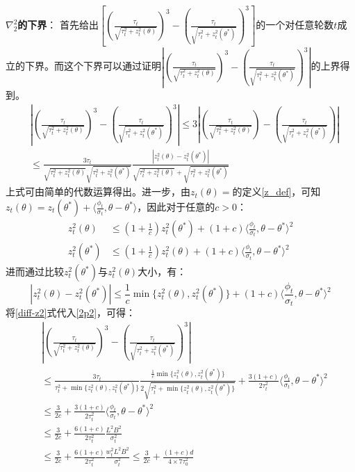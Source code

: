 \documentclass[UTF8,a4paper,10.5pt]{ctexart}
\begin{document}
\textbf{$\nabla^2_2$的下界}：
首先给出$\left[\left( \frac{\tau_t}{\sqrt{\tau_t^2 + z_t^2(\theta)}}\right)^3 - \left(\frac{\tau_t}{\sqrt{\tau_t^2 + z_t^2(\theta^*)}}\right)^3\right]$的一个对任意轮数$t$成立的下界。而这个下界可以通过证明$\left| \left( \frac{\tau_t}{\sqrt{\tau_t^2 + z_t^2(\theta)}}\right)^3 - \left(\frac{\tau_t}{\sqrt{\tau_t^2 + z_t^2(\theta^*)}}\right)^3 \right| 
$的上界得到。
\begin{align}
	&\left| \left( \frac{\tau_t}{\sqrt{\tau_t^2 + z_t^2(\theta)}}\right)^3 - \left(\frac{\tau_t}{\sqrt{\tau_t^2 + z_t^2(\theta^*)}}\right)^3 \right| 
	\leq 3\left| \left(\frac{\tau_t}{\sqrt{\tau_t^2 + z_t^2(\theta)}}\right) - \left(\frac{\tau_t}{\sqrt{\tau_t^2 + z_t^2(\theta^*)}}\right) \right|  \nonumber\\
	& \leq \frac{3\tau_t}{\sqrt{\tau_t^2 + z_t^2(\theta)}\sqrt{\tau_t^2 + z_t^2(\theta^*)}} \frac{|z_t^2(\theta)-z_t^2(\theta^*)|}{\sqrt{\tau_t^2 + z_t^2(\theta)} + \sqrt{\tau_t^2 + z_t^2(\theta^*)}}
	\label{2p2}
\end{align}
上式可由简单的代数运算得出。进一步，由$z_t(\theta) = $的定义\ref{z_def}，可知$z_t(\theta) = z_t(\theta^*)+\langle \frac{\phi_t}{\sigma_t}, \theta - \theta^* \rangle$，因此对于任意的$c>0$：
\begin{align*}
	z_t^2(\theta) &\leq \left(1+\frac{1}{c}\right)z_t^2(\theta^*) + (1+c)\langle\frac{\phi_t}{\sigma_t}, \theta-\theta^*\rangle^2 \\
	z_t^2(\theta^*) &\leq \left(1+\frac{1}{c}\right)z_t^2(\theta) + (1+c)\langle\frac{\phi_t}{\sigma_t}, \theta-\theta^*\rangle^2 
\end{align*}
进而通过比较$z_t^2(\theta^*)$与$z_t^2(\theta)$大小，有：
\begin{equation}
	|z_t^2(\theta) - z_t^2(\theta^*)| \leq \frac{1}{c} \min\{z_t^2(\theta), z_t^2(\theta^*) \} + (1+c)\langle\frac{\phi_t}{\sigma_t}, \theta-\theta^*\rangle^2
	\label{diff-z2}
\end{equation}
将\ref{diff-z2}式代入\ref{2p2}，可得：
\begin{align}
	&\left| \left( \frac{\tau_t}{\sqrt{\tau_t^2 + z_t^2(\theta)}}\right)^3 - \left(\frac{\tau_t}{\sqrt{\tau_t^2 + z_t^2(\theta^*)}}\right)^3 \right| \nonumber \\
	&\leq \frac{3\tau_t}{\tau_t^2 +\min\{z_t^2(\theta), z_t^2(\theta^*)\}} \frac{\frac{1}{c}\min\{z_t^2(\theta), z_t^2(\theta^*)\}}{2\sqrt{\tau_t^2 + \min\{z_t^2(\theta), z_t^2(\theta^*) \}}} + \frac{3(1+c)}{2\tau_t^2}\langle\frac{\phi_t}{\sigma_t},\theta - \theta^*\rangle^2 \nonumber \nonumber \\
	& \leq \frac{3}{2c} + \frac{3(1+c)}{2\tau_t^2}\langle\frac{\phi_t}{\sigma_t},\theta - \theta^*\rangle^2 \nonumber \\
	&\leq \frac{3}{2c} + \frac{6(1+c)}{2\tau_t^2}\frac{L^2B^2}{\sigma_t^2} \nonumber \\
	& \leq \frac{3}{2c} +\frac{6(1+c)}{2\tau_t^2}\frac{w_t^2L^2B^2}{\sigma_t^2} \leq \frac{3}{2c} +\frac{(1+c)d}{4\times 7\tau_0^2} 
\end{align}
\end{document}
